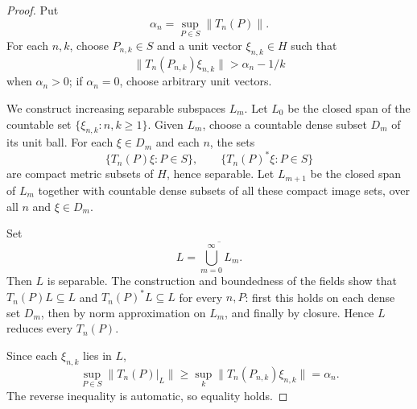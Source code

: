 \documentclass[11pt]{article}
\begin{document}
\begin{proof}
Put
\[
        \alpha_n=\sup_{P\in S}\|T_n(P)\|.
\]
For each \(n,k\), choose \(P_{n,k}\in S\) and a unit vector
\(\xi_{n,k}\in H\) such that
\[
        \|T_n(P_{n,k})\xi_{n,k}\|>\alpha_n-1/k
\]
when \(\alpha_n>0\); if \(\alpha_n=0\), choose arbitrary unit vectors.

We construct increasing separable subspaces \(L_m\).  Let \(L_0\) be the
closed span of the countable set \(\{\xi_{n,k}:n,k\ge1\}\).  Given \(L_m\),
choose a countable dense subset \(D_m\) of its unit ball.  For each
\(\xi\in D_m\) and each \(n\), the sets
\[
        \{T_n(P)\xi:P\in S\},
        \qquad
        \{T_n(P)^*\xi:P\in S\}
\]
are compact metric subsets of \(H\), hence separable.  Let \(L_{m+1}\) be the
closed span of \(L_m\) together with countable dense subsets of all these
compact image sets, over all \(n\) and \(\xi\in D_m\).

Set
\[
        L=\overline{\bigcup_{m=0}^\infty L_m}.
\]
Then \(L\) is separable.  The construction and boundedness of the fields show
that \(T_n(P)L\subseteq L\) and \(T_n(P)^*L\subseteq L\) for every \(n,P\):
first this holds on each dense set \(D_m\), then by norm approximation on
\(L_m\), and finally by closure.  Hence \(L\) reduces every \(T_n(P)\).

Since each \(\xi_{n,k}\) lies in \(L\),
\[
        \sup_{P\in S}\|T_n(P)|_L\|
        \ge
        \sup_k\|T_n(P_{n,k})\xi_{n,k}\|
        =
        \alpha_n.
\]
The reverse inequality is automatic, so equality holds.
\end{proof}
\end{document}
